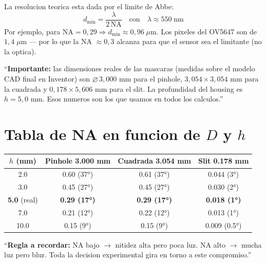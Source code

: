 \documentclass[11pt,a4paper,oneside]{report}
\begin{document}
\begin{calculo}
La resolucion teorica esta dada por el limite de Abbe:
\[
d_{\min} = \frac{\lambda}{2\,\mathrm{NA}} \quad \text{con}\quad \lambda \approx 550\;\text{nm}
\]
Por ejemplo, para $\mathrm{NA} = 0{,}29 \Rightarrow d_{\min} \approx 0{,}96\;\mu\text{m}$.
Los pixeles del OV5647 son de $1{,}4\;\mu\text{m}$ --- por lo que la NA $\approx 0{,}3$ alcanza para que el
sensor sea el limitante (no la optica).
\end{calculo}

\begin{decir}
``\textbf{Importante:} las dimensiones reales de las mascaras
(medidas sobre el modelo CAD final en Inventor) son
$\varnothing\,3{,}000$ mm para el pinhole, $3{,}054 \times 3{,}054$ mm para la cuadrada
y $0{,}178 \times 5{,}606$ mm para el slit. La profundidad del housing es $h = 5{,}0$ mm.
Esos numeros son los que usamos en todos los calculos.''
\end{decir}

\section{Tabla de NA en funcion de $D$ y $h$}

\begin{center}
\begin{tabular}{cccc}
\toprule
\textbf{$h$ (mm)} & \textbf{Pinhole 3.000 mm} & \textbf{Cuadrada 3.054 mm} & \textbf{Slit 0.178 mm} \\
\midrule
2.0 & 0.60 (37°) & 0.61 (37°) & 0.044 (3°) \\
3.0 & 0.45 (27°) & 0.45 (27°) & 0.030 (2°) \\
\textbf{5.0} (real) & \textbf{0.29 (17°)} & \textbf{0.29 (17°)} & \textbf{0.018 (1°)} \\
7.0 & 0.21 (12°) & 0.22 (12°) & 0.013 (1°) \\
10.0 & 0.15 (9°) & 0.15 (9°) & 0.009 (0.5°) \\
\bottomrule
\end{tabular}
\end{center}

\begin{decir}
``\textbf{Regla a recordar:}
NA bajo $\rightarrow$ nitidez alta pero poca luz.
NA alto $\rightarrow$ mucha luz pero blur. Toda la decision experimental gira en torno a este compromiso.''
\end{decir}

\end{document}
